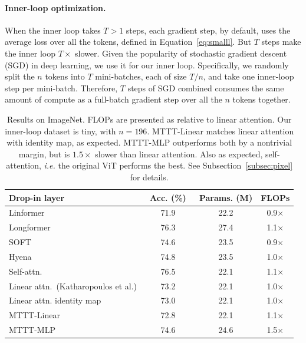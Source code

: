 \documentclass{article} %
\begin{document}
\paragraph{Inner-loop optimization.}
When the inner loop takes $T>1$ steps, each gradient step, by default, uses the average loss over all the tokens, defined in Equation~\ref{eq:smalll}.
But $T$ steps make the inner loop $T\times$ slower.
Given the popularity of stochastic gradient descent (SGD) in deep learning, we use it for our inner loop.
Specifically, we randomly split the $n$ tokens into $T$ mini-batches, each of size $T/n$, and take one inner-loop step per mini-batch.
Therefore, $T$ steps of SGD combined consumes the same amount of compute as a full-batch gradient step over all the $n$ tokens together.

\begin{table}
\centering
\vspace{-1ex}
\begin{tabular}{|l|c|c|c|}
\toprule
Drop-in layer
& ~Acc. (\%)~
& {\footnotesize Params. (M)}
& {\small FLOPs}
\\
\midrule
Linformer~{\tiny \citep{wang2020linformer}}
& 71.9 & 22.2 & 0.9$\times$\\
Longformer~{\tiny \citep{beltagy2020longformer}}
& 76.3 & 27.4 & 1.1$\times$\\
SOFT~{\tiny \citep{lu2021soft}}
& 74.6 & 23.5 & 0.9$\times$\\
Hyena~{\tiny \citep{poli2023hyena}}
& 74.8 & 23.5 & 1.0$\times$\\
\midrule
Self-attn.~{\tiny \citep{beyer2022better}} 
& 76.5 & 22.1 & 1.1$\times$ \\
Linear attn.~{\tiny (Katharopoulos et al.)}
& 73.2 & 22.1 & 1.0$\times$ \\
Linear attn. identity map
& 73.0 & 22.1 & 1.0$\times$ \\
\midrule
MTTT-Linear 
& 72.8 & 22.1 & 1.1$\times$ \\
MTTT-MLP 
& 74.6 & 24.6 & 1.5$\times$ \\
\bottomrule
\end{tabular}
\caption{
Results on ImageNet.
FLOPs are presented as relative to linear attention.
Our inner-loop dataset is tiny, with $n=196$.
MTTT-Linear matches linear attention with identity map, as expected. 
MTTT-MLP outperforms both by a nontrivial margin, but is $1.5\times$ slower than linear attention.
Also as expected, self-attention, \textit{i.e.} the original ViT performs the best.
See Subsection~\ref{subsec:pixel} for details.
}
\vspace{-1ex}
\label{tab:patch}
\end{table}
\end{document}
